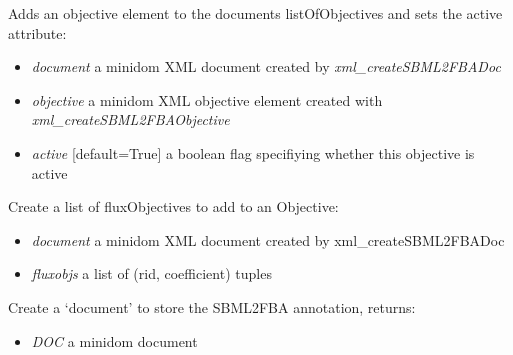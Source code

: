 \documentclass[a4paper,11pt,english]{sphinxmanual}
\begin{document}
\begin{fulllineitems}
\label{modules_doc:cbmpy.CBXML.xml_addSBML2FBAObjective}
Adds an objective element to the documents listOfObjectives and sets the active attribute:
\begin{itemize}
\item {} 
\emph{document} a minidom XML document created by \emph{xml\_createSBML2FBADoc}

\item {} 
\emph{objective} a minidom XML objective element created with \emph{xml\_createSBML2FBAObjective}

\item {} 
\emph{active} {[}default=True{]} a boolean flag specifiying whether this objective is active

\end{itemize}

\end{fulllineitems}


\begin{fulllineitems}
\label{modules_doc:cbmpy.CBXML.xml_createListOfFluxObjectives}
Create a list of fluxObjectives to add to an Objective:
\begin{itemize}
\item {} 
\emph{document} a minidom XML document created by xml\_createSBML2FBADoc

\item {} 
\emph{fluxobjs} a list of (rid, coefficient) tuples

\end{itemize}

\end{fulllineitems}


\begin{fulllineitems}
\label{modules_doc:cbmpy.CBXML.xml_createSBML2FBADoc}
Create a `document' to store the SBML2FBA annotation, returns:
\begin{itemize}
\item {} 
\emph{DOC} a minidom document

\end{itemize}

\end{fulllineitems}
\end{document}
